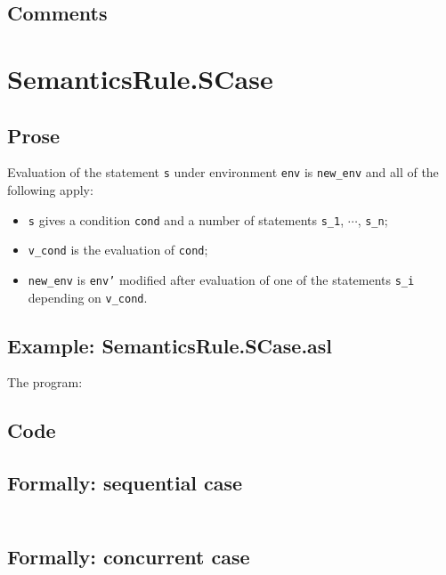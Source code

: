 \documentclass{book}
\begin{document}
  \subsection{Comments}

\section{SemanticsRule.SCase \label{sec:SemanticsRule.SCase}}

    \subsection{Prose}
  Evaluation of the statement \texttt{s} under environment \texttt{env} is
\texttt{new\_env} and all of the following apply:
    \begin{itemize}
    \item \texttt{s} gives a condition \texttt{cond} and a number of statements \texttt{s\_1}, $\cdots$, \texttt{s\_n};
    \item \texttt{v\_cond} is the evaluation of \texttt{cond};
    \item \texttt{new\_env} is \texttt{env'} modified after evaluation of one of the statements \texttt{s\_i} depending on \texttt{v\_cond}.
    \end{itemize}

    \subsection{Example: SemanticsRule.SCase.asl}
    The program:

  \subsection{Code}

  \subsection{Formally: sequential case}
  \begin{align}
  \end{align} 

  \subsection{Formally: concurrent case}
  \begin{align}
  \end{align} 
\end{document}

